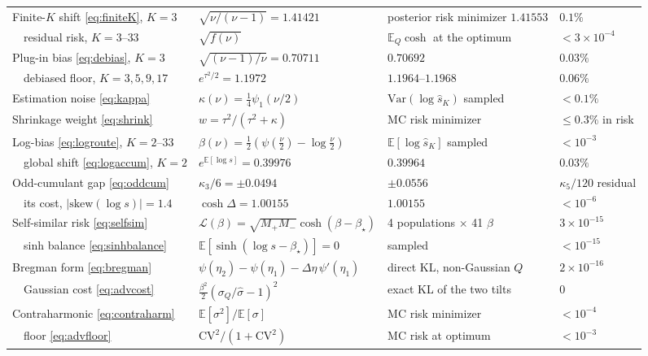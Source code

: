 \documentclass[11pt]{article}
\theoremstyle{definition}
\newcommand{\Var}{\mathrm{Var}}
\newcommand{\E}{\mathbb{E}}
\begin{document}
\begin{table}[h]
\begin{tabular}{llll}
    Finite-$K$ shift \eqref{eq:finiteK}, $K=3$
      & $\sqrt{\nu/(\nu-1)}=1.41421$ & posterior risk minimizer $1.41553$
      & $0.1\%$ \\
    \ \ residual risk, $K=3$--$33$
      & $\sqrt{f(\nu)}$ & $\E_Q\cosh$ at the optimum & $<3\times10^{-4}$ \\
    Plug-in bias \eqref{eq:debias}, $K=3$
      & $\sqrt{(\nu-1)/\nu}=0.70711$ & $0.70692$ & $0.03\%$ \\
    \ \ debiased floor, $K=3,5,9,17$
      & $e^{\tau^2/2}=1.1972$ & $1.1964$--$1.1968$ & $0.06\%$ \\
    Estimation noise \eqref{eq:kappa}
      & $\kappa(\nu)=\tfrac14\psi_1(\nu/2)$ & $\Var(\log\hat s_K)$ sampled
      & $<0.1\%$ \\
    Shrinkage weight \eqref{eq:shrink}
      & $w=\tau^2/(\tau^2+\kappa)$ & MC risk minimizer
      & $\le0.3\%$ in risk \\
    Log-bias \eqref{eq:logroute}, $K=2$--$33$
      & $\beta(\nu)=\tfrac12(\psi(\tfrac\nu2)-\log\tfrac\nu2)$
      & $\E[\log\hat s_K]$ sampled & $<10^{-3}$ \\
    \ \ global shift \eqref{eq:logaccum}, $K=2$
      & $e^{\E[\log s]}=0.39976$ & $0.39964$ & $0.03\%$ \\
    Odd-cumulant gap \eqref{eq:oddcum}
      & $\kappa_3/6=\pm0.0494$ & $\pm0.0556$ & $\kappa_5/120$ residual \\
    \ \ its cost, $|\mathrm{skew}(\log s)|=1.4$
      & $\cosh\Delta=1.00155$ & $1.00155$ & $<10^{-6}$ \\
    Self-similar risk \eqref{eq:selfsim}
      & $\mathcal L(\beta)=\sqrt{M_+M_-}\cosh(\beta-\beta_\star)$
      & 4 populations $\times$ 41 $\beta$ & $3\times10^{-15}$ \\
    \ \ sinh balance \eqref{eq:sinhbalance}
      & $\E[\sinh(\log s-\beta_\star)]=0$ & sampled & $<10^{-15}$ \\
    \addlinespace
    Bregman form \eqref{eq:bregman}
      & $\psi(\eta_2)-\psi(\eta_1)-\Delta\eta\,\psi'(\eta_1)$
      & direct KL, non-Gaussian $Q$ & $2\times10^{-16}$ \\
    \ \ Gaussian cost \eqref{eq:advcost}
      & $\tfrac{\beta^2}{2}(\sigma_Q/\hat\sigma-1)^2$ & exact KL of the two tilts
      & $0$ \\
    Contraharmonic \eqref{eq:contraharm}
      & $\E[\sigma^2]/\E[\sigma]$ & MC risk minimizer & $<10^{-4}$ \\
    \ \ floor \eqref{eq:advfloor}
      & $\mathrm{CV}^2/(1+\mathrm{CV}^2)$ & MC risk at optimum & $<10^{-3}$ \\

\end{tabular}
\end{table}
\end{document}
